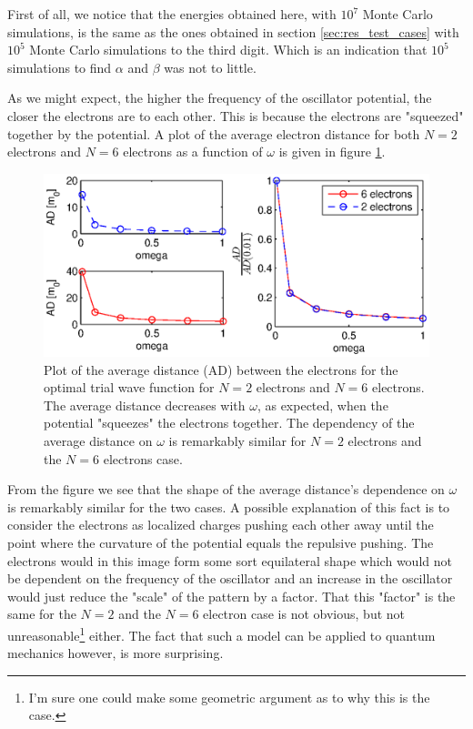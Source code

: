 First of all, we notice that the energies obtained here, with $10^7$ Monte Carlo simulations, is the same as the ones obtained in section \ref{sec:res_test_cases} with $10^5$ Monte Carlo simulations to the third digit.
Which is an indication that $10^5$ simulations to find $\alpha$ and $\beta$ was not to little. 

As we might expect, the higher the frequency of the oscillator potential, the closer the electrons are to each other.
This is because the electrons are "squeezed" together by the potential.  
A plot of the average electron distance for both $N=2$ electrons and $N=6$ electrons as a function of $\omega$ is given in figure \ref{fig:AD_electrons}.

\begin{figure}[h!]
	\centering 
	\includegraphics[width=\textwidth]{results/AD.eps}
	\caption{Plot of the average distance (AD) between the electrons for the optimal trial wave function for $N=2$ electrons and $N=6$ electrons. 
			The average distance decreases with $\omega$, as expected, when the potential "squeezes" the electrons together.
			The dependency of the average distance on $\omega$ is remarkably similar for $N=2$ electrons and the $N=6$ electrons case.}
	\label{fig:AD_electrons}
\end{figure}

From the figure we see that the shape of the average distance's dependence on $\omega$ is remarkably similar for the two cases.
A possible explanation of this fact is to consider the electrons as localized charges pushing each other away until the point where the curvature of the potential equals the repulsive pushing. 
The electrons would in this image form some sort equilateral shape which would not be dependent on the frequency of the oscillator and an increase in the oscillator would just reduce the "scale" of the pattern by a factor. 
That this "factor" is the same for the $N=2$ and the $N=6$ electron case is not obvious, but not unreasonable\footnote{I'm sure one could make some geometric argument as to why this is the case.} either.  
The fact that such a model can be applied to quantum mechanics however, is more surprising. 






